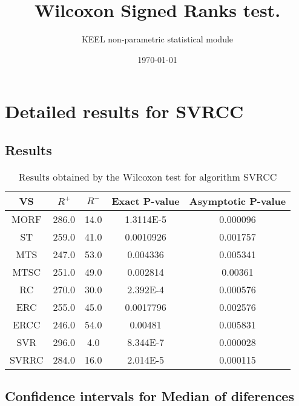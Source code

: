 \documentclass[a4paper,10pt]{article}
\title{Wilcoxon Signed Ranks test.}
\date{\today}
\author{KEEL non-parametric statistical module}
\begin{document}
\pagestyle{empty}
\maketitle
\thispagestyle{empty}



\section{Detailed results for SVRCC}


\subsection{Results}

\begin{table}[!htp]
\centering\small
\begin{tabular}{
|c|c|c|c|c|}
\hline
 VS & $R^{+}$ & $R^{-}$ & Exact P-value & Asymptotic P-value \\ \hline 
MORF & 286.0 & 14.0 & 1.3114E-5 & 0.000096\\ \hline 
ST & 259.0 & 41.0 & 0.0010926 & 0.001757\\ \hline 
MTS & 247.0 & 53.0 & 0.004336 & 0.005341\\ \hline 
MTSC & 251.0 & 49.0 & 0.002814 & 0.00361\\ \hline 
RC & 270.0 & 30.0 & 2.392E-4 & 0.000576\\ \hline 
ERC & 255.0 & 45.0 & 0.0017796 & 0.002576\\ \hline 
ERCC & 246.0 & 54.0 & 0.00481 & 0.005831\\ \hline 
SVR & 296.0 & 4.0 & 8.344E-7 & 0.000028\\ \hline 
SVRRC & 284.0 & 16.0 & 2.014E-5 & 0.000115\\ \hline 

\end{tabular}
\caption{Results obtained by the Wilcoxon test for algorithm SVRCC}
\end{table}

\subsection{Confidence intervals for Median of diferences}
\end{document}
